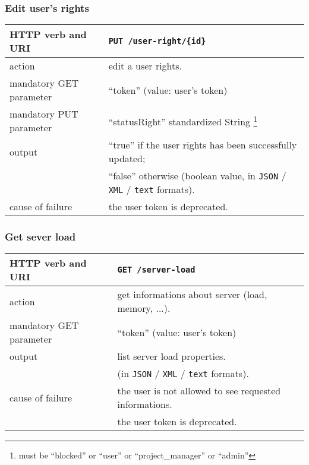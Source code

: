 \subsubsection{Edit user's rights}
\begin{tabular}{ | l | l | }
	\hline
	HTTP verb and URI & \texttt{PUT /user-right/\{id\}} \\
	\hline
	action & edit a user rights. \\
	\hline
	mandatory GET parameter & ``token'' (value: user's token) \\
	\hline
	mandatory PUT parameter & ``statusRight'' standardized String \footnote{must be ``blocked'' or ``user'' or ``project\_manager'' or ``admin''} \\		
	\hline
	output & ``true'' if the user rights has been successfully updated; \\
	\space & ``false'' otherwise (boolean value, in \texttt{JSON} / \texttt{XML} / \texttt{text} formats). \\
	\hline
	cause of failure & the user token is deprecated. \\
	\hline
\end{tabular}
\newline

\subsubsection{Get sever load}
\begin{tabular}{ | l | l | }
	\hline
	HTTP verb and URI & \texttt{GET /server-load} \\
	\hline
	action & get informations about server (load, memory, ...). \\
	\hline
	mandatory GET parameter & ``token'' (value: user's token) \\
	\hline
	output & list server load properties.  \\
	\space & (in \texttt{JSON} / \texttt{XML} / \texttt{text} formats). \\
	\hline
	cause of failure & the user is not allowed to see requested informations. \\
	\space & the user token is deprecated. \\
	\hline
\end{tabular}
\newline


